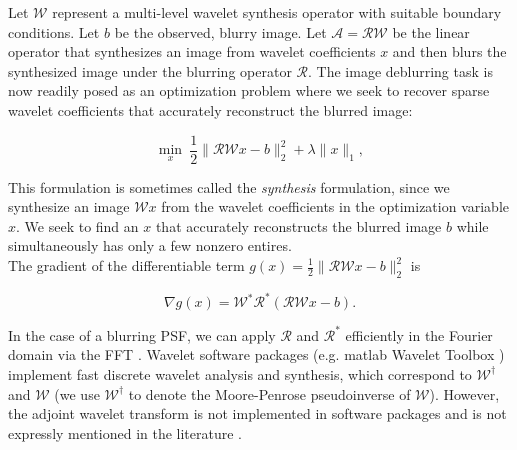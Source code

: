 \documentclass[journal]{IEEEtran}
\begin{document}
Let $\mathcal{W}$ represent a multi-level wavelet synthesis operator with suitable boundary conditions.  Let $b$ be the observed, blurry image.  Let $\mathcal{A}=\mathcal{RW}$ be the linear operator that synthesizes an image from wavelet coefficients $x$ and then blurs the synthesized image under the blurring operator $\mathcal{R}$.  The image deblurring task is now readily posed as an optimization problem where we seek to recover sparse wavelet coefficients that accurately reconstruct the blurred image:

\begin{equation}
\label{eq:syn_problem}
\min_x~ \dfrac{1}{2}\|\mathcal{RW}x-b\|_2^2 + \lambda \|x\|_1,
\end{equation}

\noindent This formulation is sometimes called the \emph{synthesis} formulation, since we synthesize an image $\mathcal{W}x$ from the wavelet coefficients in the optimization variable $x$.  We seek to find an $x$ that accurately reconstructs the blurred image $b$ while simultaneously has only a few nonzero entires.\\

The gradient of the differentiable term $g(x)={\frac{1}{2}\|\mathcal{RW}x-b\|_2^2}$ is

\[ \nabla g(x) = \mathcal{W}^\ast \mathcal{R}^\ast(\mathcal{RW}x-b). \] 

\noindent In the case of a blurring PSF, we can apply $\mathcal{R}$ and $\mathcal{R}^\ast$ efficiently in the Fourier domain via the FFT \cite{beck_2009, hansen_2006}.  Wavelet software packages (e.g. {\sc matlab} Wavelet Toolbox \cite{matlab_wt_2015}) implement fast discrete wavelet analysis and synthesis, which correspond to $\mathcal{W}^\dagger$ and $\mathcal{W}$ (we use $\mathcal{W}^\dagger$ to denote the Moore-Penrose pseudoinverse of $\mathcal{W}$).  However, the adjoint wavelet transform is not implemented in software packages and is not expressly mentioned in the literature \cite{mallat_2009, daubechies_1992, strang_1996}.\\
\end{document}
